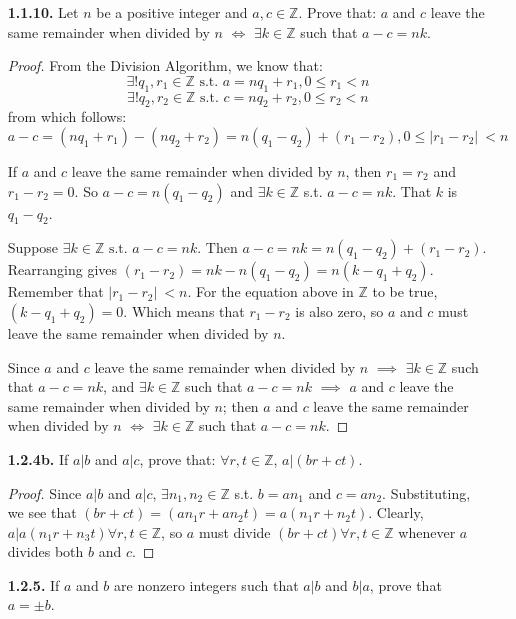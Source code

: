 \documentclass[12pt]{article}
\newcommand{\zee}{\mathbb{Z}}
\newcommand{\such}{\text{ s.t. }}
\begin{document}
\begin{itemize}
\item[\textbf{1.1.10.}] Let $n$ be a positive integer and $a,c\in \zee$. Prove that: $a$ and $c$ leave the same remainder when divided by $n$ $\iff$ $\exists k\in \zee$ such that $a-c=nk$.

\begin{proof}
From the Division Algorithm, we know that:
\[\exists! q_1, r_1 \in \zee \such a = n q_1 + r_1, 0 \leq r_1 < n\]
\[\exists! q_2, r_2 \in \zee \such c = n q_2 + r_2, 0 \leq r_2 < n\]
from which follows:
\[a - c = (n q_1 + r_1) - (n q_2 + r_2) = n (q_1 - q_2) + (r_1 - r_2), 0 \leq \lvert r_1 - r_2 \rvert\ < n\]

If $a$ and $c$ leave the same remainder when divided by $n$, then $r_1 = r_2$ and $r_1 - r_2 = 0$.
So $a - c = n (q_1 - q_2)$ and $\exists k\in \zee$ s.t. $a-c=nk$.
That $k$ is $q_1 - q_2$.
\par
Suppose $\exists k \in \zee \such a-c=nk$.
Then $a-c = nk = n (q_1 - q_2) + (r_1 - r_2)$.
Rearranging gives $(r_1 - r_2) = nk - n (q_1 - q_2) = n(k - q_1 + q_2)$.
Remember that $\lvert r_1 - r_2 \rvert\ < n$. For the equation above in $\zee$ to be true, $(k - q_1 + q_2) = 0$.
Which means that $r_1 - r_2$ is also zero, so $a$ and $c$ must leave the same remainder when divided by $n$.
\par
Since
$a$ and $c$ leave the same remainder when divided by $n$ $\implies$ $\exists k\in \zee$ such that $a-c=nk$, and
$\exists k\in \zee$ such that $a-c=nk$ $\implies$ $a$ and $c$ leave the same remainder when divided by $n$; then
$a$ and $c$ leave the same remainder when divided by $n$ $\iff$ $\exists k\in \zee$ such that $a-c=nk$.
\end{proof}



\item[\textbf{1.2.4b.}] If $a|b$ and $a|c$, prove that:  $\forall r,t\in \zee$, $a|(br+ct)$.

\begin{proof}
Since $a|b$ and $a|c$, $\exists n_1, n_2 \in \zee$ s.t. $b = a n_1$ and $c = a n_2$.
Substituting, we see that $(br+ct) = (a n_1 r + a n_2 t) = a(n_1 r + n_2 t)$.
Clearly, $a|a(n_1 r + n_3 t) \forall r,t\in \zee$, so $a$ must divide $(br+ct) \forall r,t\in \zee$ whenever $a$ divides both $b$ and $c$.
\end{proof}



\item[\textbf{1.2.5.}] If $a$ and $b$ are nonzero integers such that $a|b$ and $b|a$, prove that $a=\pm b$.


\end{itemize}
\end{document}
